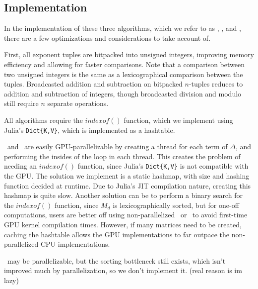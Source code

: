 \subsection{Implementation}
In the implementation of these three algorithms, which we refer to as \triv, \merge, and \wics, there are a few optimizations and considerations to take account of.

First, all exponent tuples are bitpacked into unsigned integers, improving memory efficiency and allowing for faster comparisons.
Note that a comparison between two unsigned integers is the same as a lexicographical comparison between the tuples.
Broadcasted addition and subtraction on bitpacked $n$-tuples reduces to addition and subtraction of integers, though broadcasted division and modulo still require $n$ separate operations.

All algorithms require the $indexof()$ function, which we implement using Julia's \texttt{Dict\{K,V\}}, which is implemented as a hashtable.

\triv ~and \wics ~are easily GPU-parallelizable by creating a thread for each term of $\Delta$, and performing the insides of the loop in each thread.
This creates the problem of needing an $indexof()$ function, since Julia's \texttt{Dict\{K,V\}} is not compatible with the GPU.
The solution we implement is a static hashmap, with size and hashing function decided at runtime.
Due to Julia's JIT compilation nature, creating this hashmap is quite slow.
Another solution can be to perform a binary search for the $indexof()$ function, since $M_d$ is lexicographically sorted, but for one-off computations, users are better off using non-parallelized \merge ~or \wics ~to avoid first-time GPU kernel compilation times.
However, if many matrices need to be created, caching the hashtable allows the GPU implementations to far outpace the non-parallelized CPU implementations.

\merge ~may be parallelizable, but the sorting bottleneck still exists, which isn't improved much by parallelization, so we don't implement it. (real reason is im lazy)